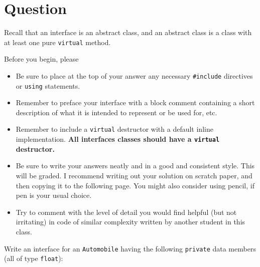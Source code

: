 




\docCopyright


\newEvenPage

\section{Question}

Recall that an interface is an abstract class, and an abstract class is a class
with at least one pure \texttt{virtual} method.

Before you begin, please
\begin{itemize}
  \item Be sure to place at the top of your answer any necessary
    \texttt{#include} directives or \texttt{using}
    statements.
  \item Remember to preface your interface with a block comment containing a
    short description of what it is intended to represent or be used for, etc.
  \item Remember to include a \texttt{virtual} destructor with a
    default inline implementation.  \textbf{All interfaces classes should have
    a \texttt{virtual} destructor.}
  \item Be sure to write your answers neatly and in a good and consistent
    style.  This will be graded.  I recommend writing out your solution on
    scratch paper, and then copying it to the following page.  You might also
    consider using pencil, if pen is your usual choice.
  \item Try to comment with the level of detail you would find helpful (but not
    irritating) in code of similar complexity written by another student in
    this class.
\end{itemize}

Write an interface for an \texttt{Automobile} having the following
\texttt{private} data members (all of type \texttt{float}):

